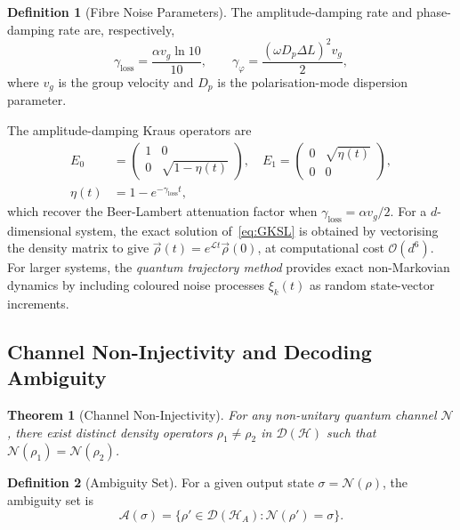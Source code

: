 \documentclass[journal,twocolumn]{IEEEtran}
\theoremstyle{definition}
\newtheorem{definition}{Definition}[section]
\theoremstyle{plain}
\newtheorem{theorem}{Theorem}[section]
\newcommand{\calH}{\mathcal{H}}
\begin{document}
\begin{definition}[Fibre Noise Parameters]
The amplitude-damping rate and phase-damping rate are, respectively,
\begin{equation}
  \gamma_{\mathrm{loss}} = \frac{\alpha v_g \ln 10}{10}, \qquad
  \gamma_\varphi = \frac{(\omega D_p \Delta L)^2 v_g}{2},
  \label{eq:noise_rates}
\end{equation}
where $v_g$ is the group velocity and $D_p$ is the
polarisation-mode dispersion parameter.
\end{definition}

The amplitude-damping Kraus operators are
\begin{align}
  E_0 &= \begin{pmatrix}1 & 0 \\ 0 & \sqrt{1-\eta(t)}\end{pmatrix},
  \quad
  E_1 = \begin{pmatrix}0 & \sqrt{\eta(t)} \\ 0 & 0\end{pmatrix},
  \label{eq:kraus}\\
  \eta(t) &= 1 - e^{-\gamma_{\mathrm{loss}} t}, \nonumber
\end{align}
which recover the Beer-Lambert attenuation factor when
$\gamma_{\mathrm{loss}} = \alpha v_g/2$.  For a $d$-dimensional
system, the exact solution of~\eqref{eq:GKSL} is obtained by
vectorising the density matrix to give $\vec\rho(t) =
e^{\mathcal{L}t}\vec\rho(0)$, at computational cost
$\mathcal{O}(d^6)$.  For larger systems, the \emph{quantum
trajectory method} provides exact non-Markovian dynamics by
including coloured noise processes $\xi_k(t)$ as random
state-vector increments.

\subsection{Channel Non-Injectivity and Decoding Ambiguity}

\begin{theorem}[Channel Non-Injectivity]
\label{thm:non_inject}
For any non-unitary quantum channel $\mathcal{N}$, there exist
distinct density operators $\rho_1 \ne \rho_2$ in
$\mathcal{D}(\calH)$ such that $\mathcal{N}(\rho_1) =
\mathcal{N}(\rho_2)$.
\end{theorem}

\begin{definition}[Ambiguity Set]
For a given output state $\sigma = \mathcal{N}(\rho)$, the ambiguity
set is
\begin{equation}
  \mathcal{A}(\sigma) = \bigl\{\rho' \in \mathcal{D}(\calH_A)
    : \mathcal{N}(\rho') = \sigma\bigr\}.
  \label{eq:ambiguity_set}
\end{equation}
\end{definition}
\end{document}
